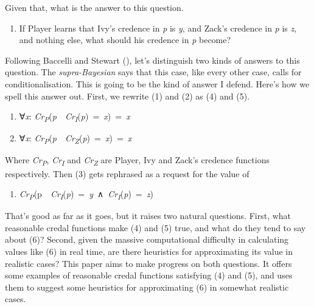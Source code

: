 \documentclass[
  11pt,
  letterpaper,
  DIV=11,
  numbers=noendperiod,
  twoside]{scrartcl}
\providecommand{\tightlist}{%
  \setlength{\itemsep}{0pt}\setlength{\parskip}{0pt}}
\begin{document}
Given that, what is the answer to this question.

\begin{enumerate}
\def\labelenumi{(\arabic{enumi})}
\setcounter{enumi}{2}
\tightlist
\item
  If Player learns that Ivy's credence in \emph{p} is \emph{y}, and
  Zack's credence in \emph{p} is \emph{z}, and nothing else, what should
  his credence in \emph{p} become?
\end{enumerate}

Following Baccelli and Stewart
(), let's distinguish two kinds
of answers to this question. The \emph{supra-Bayesian} says that this
case, like every other case, calls for conditionalisation. This is going
to be the kind of answer I defend. Here's how we spell this answer out.
First, we rewrite (1) and (2) as (4) and (5).

\begin{enumerate}
\def\labelenumi{(\arabic{enumi})}
\setcounter{enumi}{3}
\tightlist
\item
  ∀\emph{x}:
  \emph{Cr\textsubscript{P}}(\emph{p}~\textbar~\emph{Cr\textsubscript{I}}(\emph{p})~=~\emph{x})~=~\emph{x}
\item
  ∀\emph{x}:
  \emph{Cr\textsubscript{P}}(\emph{p}~\textbar~\emph{Cr\textsubscript{Z}}(\emph{p})~=~\emph{x})~=~\emph{x}
\end{enumerate}

Where \emph{Cr\textsubscript{P}}, \emph{Cr\textsubscript{I}} and
\emph{Cr\textsubscript{Z}} are Player, Ivy and Zack's credence functions
respectively. Then (3) gets rephrased as a request for the value of

\begin{enumerate}
\def\labelenumi{(\arabic{enumi})}
\setcounter{enumi}{5}
\tightlist
\item
  \emph{Cr\textsubscript{P}}(p~\textbar~\emph{Cr\textsubscript{I}}(\emph{p})~=~\emph{y}~∧~\emph{Cr\textsubscript{I}}(\emph{p})~=~\emph{z})
\end{enumerate}

That's good as far as it goes, but it raises two natural questions.
First, what reasonable credal functions make (4) and (5) true, and what
do they tend to say about (6)? Second, given the massive computational
difficulty in calculating values like (6) in real time, are there
heuristics for approximating its value in realistic cases? This paper
aims to make progress on both questions. It offers some examples of
reasonable credal functions satisfying (4) and (5), and uses them to
suggest some heuristics for approximating (6) in somewhat realistic
cases.
\end{document}
